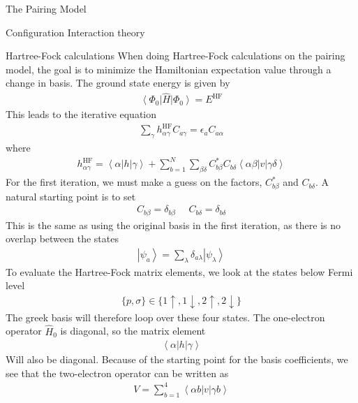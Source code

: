 \documentclass[twoside,english]{uiofysmaster}
\begin{document}
\begin{chapter}{The Pairing Model}
\begin{section}{Configuration Interaction theory}
	\end{section}

	\begin{section}{Hartree-Fock calculations}
		When doing Hartree-Fock calculations on the pairing model, the goal is to minimize the Hamiltonian expectation value through a change in basis. The ground state energy is given by 
		\begin{align}
			\left< \Phi_0 \right| \hat H \left| \Phi_0 \right> = E^{\text{HF}}
		\end{align}
		This leads to the iterative equation 
		\begin{align}
  			\sum_{\gamma} h_{\alpha \gamma}^{\text{HF}} C_{a \gamma} = \epsilon_{a} C_{a \alpha}
  		\end{align}
  		where 
  		\begin{align}
  			h_{\alpha \gamma}^{\text{HF}} = \left< \alpha \right| h \left| \gamma \right> + \sum_{b=1}^N \sum_{\beta \delta} C_{b \beta}^* C_{b \delta} \left< \alpha \beta \right| v \left| \gamma \delta \right> 
  		\end{align}
  		For the first iteration, we must make a guess on the factors, $C_{b \beta}^*$ and $C_{b \delta}$. A natural starting point is to set
  		\begin{align}
  			C_{b \beta} = \delta_{b \beta} \:\:\:\:\:\: C_{b \delta} = \delta_{b \delta}
  		\end{align}
  		This is the same as using the original basis in the first iteration, as there is no overlap between the states
  		\begin{align}
  			\left| \psi_a \right> = \sum_ \lambda \delta_{a \lambda} \left| \psi_ \lambda \right> 
  		\end{align}
  		To evaluate the Hartree-Fock matrix elements, we look at the states below Fermi level 
  		\begin{align}
  			\{p, \sigma\} \in \{ 1 \uparrow, 1 \downarrow, 2 \uparrow, 2 \downarrow \}
  		\end{align}
  		The greek basis will therefore loop over these four states. The one-electron operator $\hat H_0$ is diagonal, so the matrix element
  		\begin{align}
  			\left< \alpha | h | \gamma \right> 
  		\end{align}
 		Will also be diagonal. Because of the starting point for the basis coefficients, we see that the two-electron operator can be written as
 		\begin{align}
 			V = \sum_{ b = 1 }^4 \left< \alpha b | v | \gamma b \right>  

\end{align}
\end{section}
\end{chapter}
\end{document}
